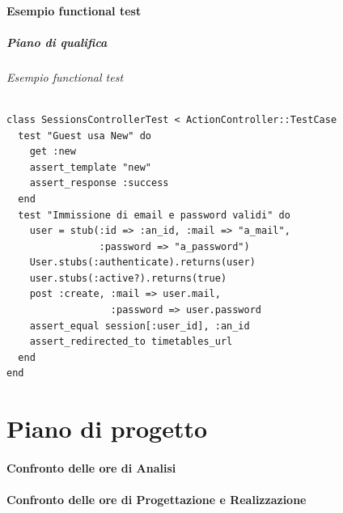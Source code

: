 \documentclass[10pt]{beamer}
\begin{document}
\subsection{Esempio functional test}
\begin{frame}[fragile]
  \frametitle{Piano di qualifica}
  \framesubtitle{Esempio functional test}
\begin{small}
\begin{verbatim}
class SessionsControllerTest < ActionController::TestCase
  test "Guest usa New" do
    get :new
    assert_template "new"
    assert_response :success
  end
  test "Immissione di email e password validi" do
    user = stub(:id => :an_id, :mail => "a_mail",
                :password => "a_password")
    User.stubs(:authenticate).returns(user)
    user.stubs(:active?).returns(true)
    post :create, :mail => user.mail,
                  :password => user.password
    assert_equal session[:user_id], :an_id
    assert_redirected_to timetables_url
  end
end
\end{verbatim} 
\end{small}
\end{frame}
\part{Piano di progetto}
\frame{
	\transsplitverticalin
	\partpage }
\subsection{Confronto delle ore di Analisi}
\subsection{Confronto delle ore di Progettazione e Realizzazione}
\end{document}

